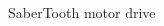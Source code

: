 \begin{spacing}{1.5}
\begin{multicols}{3}
\\
SaberTooth motor drive\\

\end{multicols}
\end{spacing}

